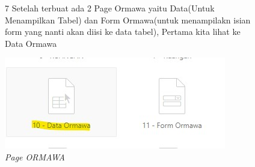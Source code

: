 \begin{itemize}
        \begin{figure}[!htbp]
        \item[7]Setelah terbuat ada 2 Page Ormawa yaitu Data(Untuk Menampilkan Tabel) dan Form Ormawa(untuk menampilakn isian form yang nanti akan diisi ke data tabel), Pertama kita lihat ke Data Ormawa
        \begin{center}
        \includegraphics[scale=0.45]{figures/kita_pilih_terlebih_dahulu_data_ormawa.jpg}
        \caption{\textit{Page ORMAWA}}
        \end{center}
        \end{figure}
        

\end{itemize}
